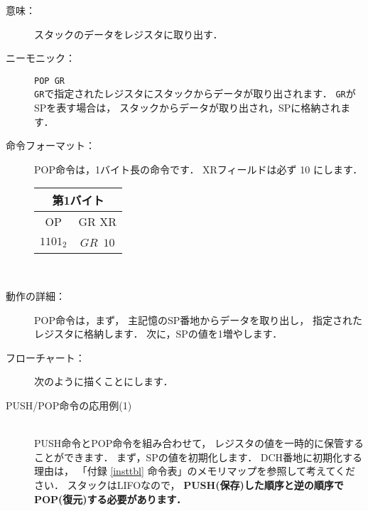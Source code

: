 \begin{description}
\item[意味：]スタックのデータをレジスタに取り出す．

\item[ニーモニック：]{\tt POP  GR} \\
{\tt GR}で指定されたレジスタにスタックからデータが取り出されます．
{\tt GR}がSPを表す場合は，
スタックからデータが取り出され，SPに格納されます．

\item[命令フォーマット：]POP命令は，1バイト長の命令です．
XRフィールドは必ず 10 にします．

\begin{tabular}{|c|c|} \hline
\multicolumn{2}{|c|}{第1バイト} \\
\hline
OP & GR XR \\
\hline
$1101_2$ & $GR$~$10$ \\
\hline
\end{tabular}\\

\item[動作の詳細：]POP命令は，まず，
主記憶のSP番地からデータを取り出し，
指定されたレジスタに格納します．
次に，SPの値を1増やします．

\item[フローチャート：]
次のように描くことにします．

\begin{flushleft}
\epsfxsize=3cm
\end{flushleft}

\item[PUSH/POP命令の応用例(1)]　\\
PUSH命令とPOP命令を組み合わせて，
レジスタの値を一時的に保管することができます．
まず，SPの値を初期化します．
DCH番地に初期化する理由は，
「付録 \ref{insttbl} 命令表」のメモリマップを参照して考えてください．
スタックはLIFOなので，
{\bf PUSH(保存)した順序と逆の順序でPOP(復元)する必要があります．}


\end{description}
